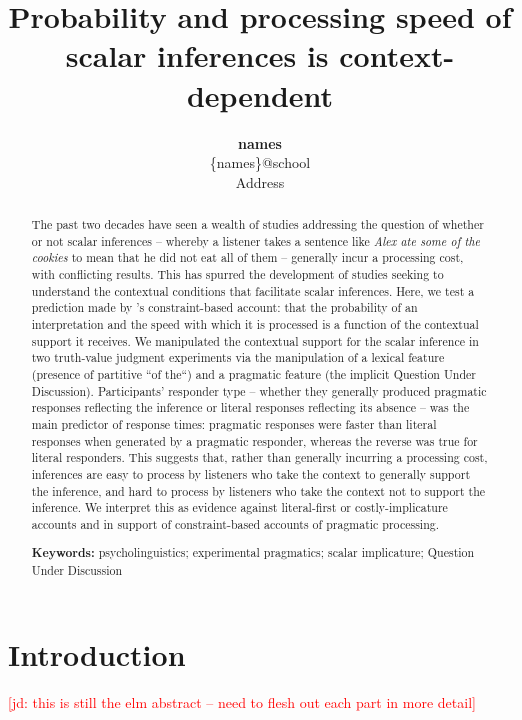\documentclass[10pt,letterpaper]{article}
\title{Probability and processing speed of scalar inferences is context-dependent}
\author{{\large \textbf{names}}  \\
 \{names\}@school\\
  Address}
\newcommand{\jd}[1]{\textcolor{Red}{[jd: #1]}}
\begin{document}
\maketitle


\begin{abstract}

 The past two decades have seen a wealth of studies addressing the question of whether or not scalar inferences -- whereby a listener takes a sentence like \textit{Alex ate some of the cookies} to mean that he did not eat all of them -- generally incur a processing cost, with conflicting results. This has spurred the development of studies seeking to understand the contextual conditions that facilitate scalar inferences. Here, we test a prediction made by 's constraint-based account: that the probability of an interpretation and the speed with which it is processed is a function of the contextual support it receives. We manipulated the contextual support for the scalar inference in two truth-value judgment experiments  via the manipulation of a lexical feature (presence of partitive ``of the``) and a pragmatic feature (the implicit Question Under Discussion). Participants' responder type -- whether they generally produced pragmatic responses reflecting the inference or literal responses reflecting its absence -- was the main predictor of response times: pragmatic responses  were faster than literal responses when generated by a pragmatic responder, whereas the reverse was true for literal responders. This suggests that, rather than generally incurring a processing cost, inferences are easy to process by listeners who take the context to generally support the inference, and hard to process by listeners who take the context not to support the inference. We interpret this as evidence against literal-first or costly-implicature accounts and in support of constraint-based accounts of pragmatic processing.

\textbf{Keywords:} psycholinguistics; experimental pragmatics; scalar implicature; Question Under Discussion

\end{abstract}

\section{Introduction}

\jd{this is still the elm abstract -- need to flesh out each part in more detail}
\end{document}
